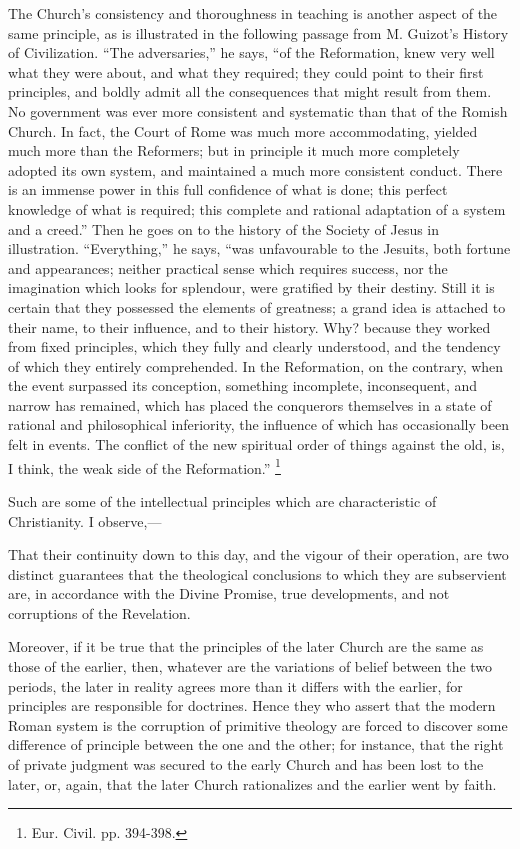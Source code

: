 The Church's consistency and thoroughness in teaching is another
aspect of the same principle, as is illustrated in the following
passage from M. Guizot's History of Civilization. ``The
adversaries,'' he says, ``of the Reformation, knew very well
what they were about, and what they required; they could point to
their first principles, and boldly admit all the consequences that
might result from them. No government was ever more consistent and
systematic than that of the Romish Church. In fact, the Court of Rome
was much more accommodating, yielded much more than the Reformers; but
in principle it much more completely adopted its own system, and
maintained a much more consistent conduct. There is an immense power
in this full confidence of what is done; this perfect knowledge of
what is required; this complete and rational adaptation of a system
and a creed.'' Then he goes on to the history of the Society of
Jesus in illustration. ``Everything,'' he says, ``was
unfavourable to the Jesuits, both fortune and appearances; neither
practical sense which requires success, nor the imagination which
looks for splendour, were gratified by their destiny. Still it is
certain that they possessed the elements of greatness; a grand idea is
attached to their name, to their influence, and to their history. Why?
because they worked from fixed principles, which they fully and
clearly understood, and the tendency of which they entirely
comprehended. In the Reformation, on the contrary, when the event
surpassed its conception, something incomplete, inconsequent, and
narrow has remained, which has placed the conquerors themselves in a
state of rational and philosophical inferiority, the influence of
which has occasionally been felt in events. The conflict of the new
spiritual order of things against the old, is, I think, the weak side
of the Reformation.'' \footnote{Eur. Civil. pp. 394-398.}


Such are some of the intellectual principles which are
characteristic of Christianity. I observe,—

That their continuity down to this day, and the vigour of their
operation, are two distinct guarantees that the theological
conclusions to which they are subservient are, in accordance with the
Divine Promise, true developments, and not corruptions of the
Revelation.

Moreover, if it be true that the principles of the later Church are
the same as those of the earlier, then, whatever are the variations of
belief between the two periods, the later in reality agrees more than
it differs with the earlier, for principles are responsible for
doctrines. Hence they who assert that the modern Roman system is the
corruption of primitive theology are forced to discover some
difference of principle between the one and the other; for instance,
that the right of private judgment was secured to the early Church and
has been lost to the later, or, again, that the later Church
rationalizes and the earlier went by faith.

